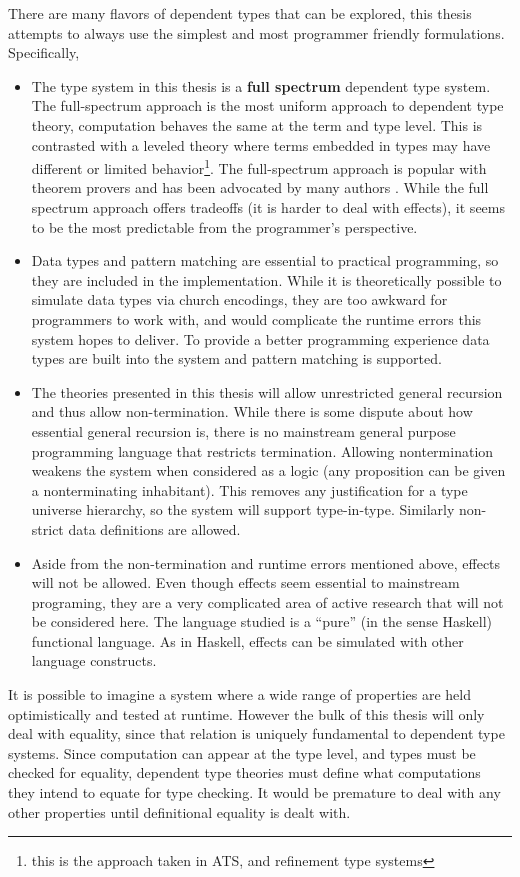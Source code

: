 There are many flavors of dependent types that can be explored, this thesis attempts to always use the simplest and most programmer friendly formulations.
Specifically,
\begin{itemize}
\item The type system in this thesis is a \textbf{full spectrum} dependent type system.
The full-spectrum approach is the most uniform approach to dependent type theory, computation behaves the same at the term and type level.
This is contrasted with a leveled theory where terms embedded in types may have different or limited behavior\footnote{this is the approach taken in ATS, and refinement type systems}.
The full-spectrum approach is popular with theorem provers and has been advocated by many authors \cite{10.1145/289423.289451,norell2007towards,brady2013idris,sjoberg2012irrelevance}.
While the full spectrum approach offers tradeoffs (it is harder to deal with effects), it seems to be the most predictable from the programmer's perspective.
\item Data types and pattern matching are essential to practical programming, so they are included in the implementation.
While it is theoretically possible to simulate data types via church encodings, they are too awkward for programmers to work with, and would complicate the runtime errors this system hopes to deliver.
To provide a better programming experience data types are built into the system and pattern matching is supported.
\item The theories presented in this thesis will allow unrestricted general recursion and thus allow non-termination.
While there is some dispute about how essential general recursion is,
there is no mainstream general purpose programming language that restricts termination.
Allowing nontermination weakens the system when considered as a logic (any proposition can be given a nonterminating inhabitant).
This removes any justification for a type universe hierarchy, so the system will support type-in-type.
Similarly non-strict data definitions are allowed.
\item Aside from the non-termination and runtime errors mentioned above, effects will not be allowed.
Even though effects seem essential to mainstream programing, they are a very complicated area of active research that will not be considered here.
The language studied is a ``pure'' (in the sense  Haskell) functional language.
As in Haskell, effects can be simulated with other language constructs.
\end{itemize}
It is possible to imagine a system where a wide range of properties are held optimistically and tested at runtime.
However the bulk of this thesis will only deal with equality, since that relation is uniquely fundamental to dependent type systems.
Since computation can appear at the type level, and types must be checked for equality, dependent type theories must define what computations they intend to equate for type checking.
It would be premature to deal with any other properties until definitional equality is dealt with.

